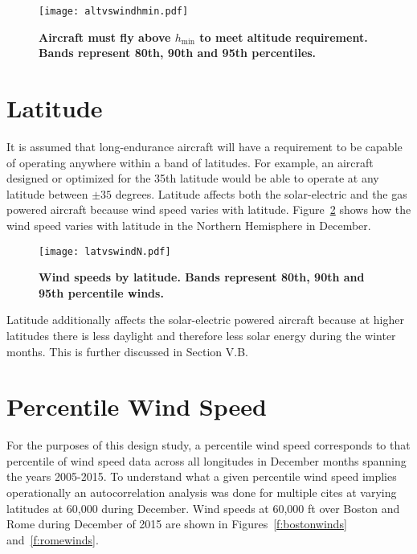 \begin{figure}[h!]
	\begin{center}
	\texttt{[image: altvswindhmin.pdf]}
    \caption{\textbf{Aircraft must fly above $h_{\text{min}}$ to meet altitude requirement. Bands represent 80th, 90th and 95th percentiles.\cite{wind}}}
	\label{f:altvswindhmin}
	\end{center}
\end{figure}


\section{Latitude}

It is assumed that long-endurance aircraft will have a requirement to be capable of operating anywhere within a band of latitudes.  
For example, an aircraft designed or optimized for the 35th latitude would be able to operate at any latitude between $\pm35$ degrees. 
Latitude affects both the solar-electric and the gas powered aircraft because wind speed varies with latitude. 
Figure~\ref{f:latvswind} shows how the wind speed varies with latitude in the Northern Hemisphere in December. 

\begin{figure}[h!]
	\begin{center}
	\texttt{[image: latvswindN.pdf]}
    \caption{\textbf{Wind speeds by latitude.  Bands represent 80th, 90th and 95th percentile winds.\cite{wind} }}
	\label{f:latvswind}
	\end{center}
\end{figure}

Latitude additionally affects the solar-electric powered aircraft because at higher latitudes there is less daylight and therefore less solar energy during the winter months. This is further discussed in Section V.B.

\section{Percentile Wind Speed}

For the purposes of this design study, a percentile wind speed corresponds to that percentile of wind speed data across all longitudes in December months spanning the years 2005-2015.  
To understand what a given percentile wind speed implies operationally an autocorrelation analysis was done for multiple cites at varying latitudes at 60,000 during December. 
Wind speeds at 60,000 ft over Boston and Rome during December of 2015 are shown in Figures~\ref{f:bostonwinds} and~\ref{f:romewinds}. 

